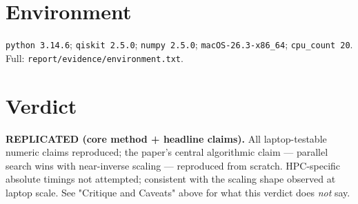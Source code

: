 \documentclass[11pt]{article}
\begin{document}
\section{Environment}
\texttt{python 3.14.6}; \texttt{qiskit 2.5.0}; \texttt{numpy 2.5.0};
\texttt{macOS-26.3-x86\_64}; \texttt{cpu\_count 20}.
Full: \texttt{report/evidence/environment.txt}.

\section{Verdict}
\textbf{REPLICATED (core method + headline claims).} All laptop-testable
numeric claims reproduced; the paper's central algorithmic claim ---
parallel search wins with near-inverse scaling --- reproduced from
scratch. HPC-specific absolute timings not attempted; consistent with
the scaling shape observed at laptop scale. See "Critique and Caveats"
above for what this verdict does \emph{not} say.


\end{document}
